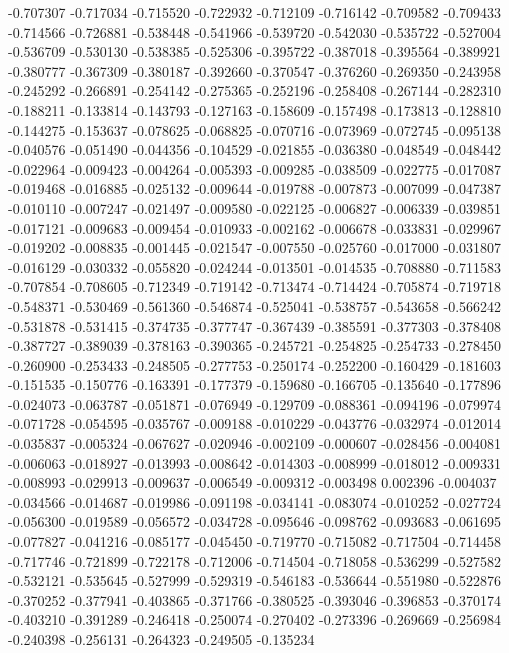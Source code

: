 -0.707307
-0.717034
-0.715520
-0.722932
-0.712109
-0.716142
-0.709582
-0.709433
-0.714566
-0.726881
-0.538448
-0.541966
-0.539720
-0.542030
-0.535722
-0.527004
-0.536709
-0.530130
-0.538385
-0.525306
-0.395722
-0.387018
-0.395564
-0.389921
-0.380777
-0.367309
-0.380187
-0.392660
-0.370547
-0.376260
-0.269350
-0.243958
-0.245292
-0.266891
-0.254142
-0.275365
-0.252196
-0.258408
-0.267144
-0.282310
-0.188211
-0.133814
-0.143793
-0.127163
-0.158609
-0.157498
-0.173813
-0.128810
-0.144275
-0.153637
-0.078625
-0.068825
-0.070716
-0.073969
-0.072745
-0.095138
-0.040576
-0.051490
-0.044356
-0.104529
-0.021855
-0.036380
-0.048549
-0.048442
-0.022964
-0.009423
-0.004264
-0.005393
-0.009285
-0.038509
-0.022775
-0.017087
-0.019468
-0.016885
-0.025132
-0.009644
-0.019788
-0.007873
-0.007099
-0.047387
-0.010110
-0.007247
-0.021497
-0.009580
-0.022125
-0.006827
-0.006339
-0.039851
-0.017121
-0.009683
-0.009454
-0.010933
-0.002162
-0.006678
-0.033831
-0.029967
-0.019202
-0.008835
-0.001445
-0.021547
-0.007550
-0.025760
-0.017000
-0.031807
-0.016129
-0.030332
-0.055820
-0.024244
-0.013501
-0.014535
-0.708880
-0.711583
-0.707854
-0.708605
-0.712349
-0.719142
-0.713474
-0.714424
-0.705874
-0.719718
-0.548371
-0.530469
-0.561360
-0.546874
-0.525041
-0.538757
-0.543658
-0.566242
-0.531878
-0.531415
-0.374735
-0.377747
-0.367439
-0.385591
-0.377303
-0.378408
-0.387727
-0.389039
-0.378163
-0.390365
-0.245721
-0.254825
-0.254733
-0.278450
-0.260900
-0.253433
-0.248505
-0.277753
-0.250174
-0.252200
-0.160429
-0.181603
-0.151535
-0.150776
-0.163391
-0.177379
-0.159680
-0.166705
-0.135640
-0.177896
-0.024073
-0.063787
-0.051871
-0.076949
-0.129709
-0.088361
-0.094196
-0.079974
-0.071728
-0.054595
-0.035767
-0.009188
-0.010229
-0.043776
-0.032974
-0.012014
-0.035837
-0.005324
-0.067627
-0.020946
-0.002109
-0.000607
-0.028456
-0.004081
-0.006063
-0.018927
-0.013993
-0.008642
-0.014303
-0.008999
-0.018012
-0.009331
-0.008993
-0.029913
-0.009637
-0.006549
-0.009312
-0.003498
0.002396
-0.004037
-0.034566
-0.014687
-0.019986
-0.091198
-0.034141
-0.083074
-0.010252
-0.027724
-0.056300
-0.019589
-0.056572
-0.034728
-0.095646
-0.098762
-0.093683
-0.061695
-0.077827
-0.041216
-0.085177
-0.045450
-0.719770
-0.715082
-0.717504
-0.714458
-0.717746
-0.721899
-0.722178
-0.712006
-0.714504
-0.718058
-0.536299
-0.527582
-0.532121
-0.535645
-0.527999
-0.529319
-0.546183
-0.536644
-0.551980
-0.522876
-0.370252
-0.377941
-0.403865
-0.371766
-0.380525
-0.393046
-0.396853
-0.370174
-0.403210
-0.391289
-0.246418
-0.250074
-0.270402
-0.273396
-0.269669
-0.256984
-0.240398
-0.256131
-0.264323
-0.249505
-0.135234
